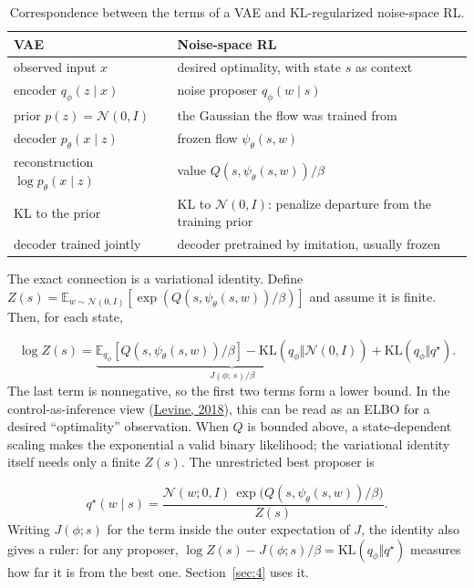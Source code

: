 \begin{table}[htbp]
\centering\small
\caption{Correspondence between the terms of a VAE and KL-regularized noise-space RL.}
\label{tab:vae}
\begin{tabularx}{\linewidth}{@{}>{\raggedright\arraybackslash}X>{\raggedright\arraybackslash}X@{}}
\toprule
VAE & Noise-space RL \\
\midrule
observed input $x$ & desired optimality, with state $s$ as context \\
encoder $q_\phi(z \mid x)$ & noise proposer $q_\phi(w \mid s)$ \\
prior $p(z) = \mathcal{N}(0, I)$ & the Gaussian the flow was trained from \\
decoder $p_\theta(x \mid z)$ & frozen flow $\psi_\theta(s, w)$ \\
reconstruction $\log p_\theta(x \mid z)$ & value $Q(s, \psi_\theta(s, w)) / \beta$ \\
KL to the prior & KL to $\mathcal{N}(0, I)$: penalize departure from the training prior \\
decoder trained jointly & decoder pretrained by imitation, usually frozen \\
\bottomrule
\end{tabularx}
\end{table}

The exact connection is a variational identity. Define $Z(s) = \mathbb{E}_{w \sim \mathcal{N}(0,I)}[\exp(Q(s, \psi_\theta(s,w))/\beta)]$ and assume it is finite. Then, for each state,

\begin{equation}
\log Z(s) = \underbrace{\mathbb{E}_{q_\phi}[Q(s, \psi_\theta(s,w))/\beta] - \mathrm{KL}(q_\phi \Vert \mathcal{N}(0,I))}_{J(\phi;\, s)/\beta} + \mathrm{KL}(q_\phi \Vert q^\star).
\end{equation}
The last term is nonnegative, so the first two terms form a lower bound. In the control-as-inference view (\hyperlink{ref:22}{Levine, 2018}), this can be read as an ELBO for a desired ``optimality'' observation. When $Q$ is bounded above, a state-dependent scaling makes the exponential a valid binary likelihood; the variational identity itself needs only a finite $Z(s)$. The unrestricted best proposer is

\begin{equation}
q^\star(w \mid s) = \frac{\mathcal{N}(w; 0, I)\, \exp\big(Q(s, \psi_\theta(s, w))/\beta\big)}{Z(s)}.
\end{equation}
Writing $J(\phi; s)$ for the term inside the outer expectation of $J$, the identity also gives a ruler: for any proposer, $\log Z(s) - J(\phi; s)/\beta = \mathrm{KL}(q_\phi \Vert q^\star)$ measures how far it is from the best one. Section~\ref{sec:4} uses it.

